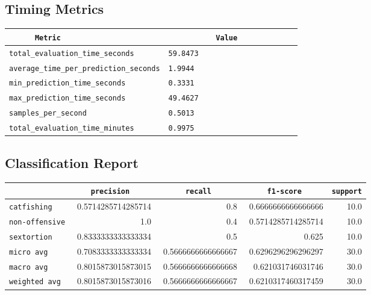 \documentclass{article}
\begin{document}
\subsection{Timing Metrics}

\begin{center}
\begin{tabular}{l | l} \hline
    \verb|      Metric     | & \verb|           Value           | \\ \hline
    \hline
    \verb|total_evaluation_time_seconds| & \verb|59.8473                      | \\ \hline
    \verb|average_time_per_prediction_seconds| & \verb|1.9944                       | \\ \hline
    \verb|min_prediction_time_seconds| & \verb|0.3331                       | \\ \hline
    \verb|max_prediction_time_seconds| & \verb|49.4627                      | \\ \hline
    \verb|samples_per_second| & \verb|0.5013                       | \\ \hline
    \verb|total_evaluation_time_minutes| & \verb|0.9975                       | \\ \hline
\end{tabular}
\end{center}

\subsection{Classification Report}

\begin{center}
\begin{tabular}{l | r | r | r | r} \hline
    \verb|            | & \verb|    precision     | & \verb|      recall      | & \verb|     f1-score     | & \verb|support| \\ \hline
    \hline
    \verb|catfishing | & 0.5714285714285714 & 0.8 & 0.6666666666666666 &    10.0 \\ \hline
    \verb|non-offensive| & 1.0 & 0.4 & 0.5714285714285714 &    10.0 \\ \hline
    \verb|sextortion | & 0.8333333333333334 & 0.5 & 0.625 &    10.0 \\ \hline
    \verb|micro avg  | & 0.7083333333333334 & 0.5666666666666667 & 0.6296296296296297 &    30.0 \\ \hline
    \verb|macro avg  | & 0.8015873015873015 & 0.5666666666666668 & 0.621031746031746 &    30.0 \\ \hline
    \verb|weighted avg| & 0.8015873015873016 & 0.5666666666666667 & 0.6210317460317459 &    30.0 \\ \hline
\end{tabular}
\end{center}
\end{document}
